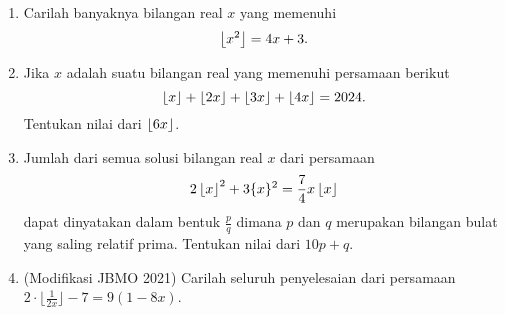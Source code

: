 \documentclass[11pt]{scrartcl}
\begin{document}
\begin{enumerate}
    \item Carilah banyaknya bilangan real $x$ yang memenuhi
    $$\left\lfloor x^2 \right\rfloor=4x+3.$$

    \item Jika $x$ adalah suatu bilangan real yang memenuhi persamaan berikut
    $$\left\lfloor x \right\rfloor+\left\lfloor 2x \right\rfloor+\left\lfloor 3x \right\rfloor+\left\lfloor 4x \right\rfloor=2024.$$
    Tentukan nilai dari $\left\lfloor 6x \right\rfloor$.

    \item Jumlah dari semua solusi bilangan real $x$ dari persamaan
    $$2\left\lfloor x \right\rfloor^2+3\{x\}^2=\frac{7}{4}x\left\lfloor x \right\rfloor$$
    dapat dinyatakan dalam bentuk $\frac{p}{q}$ dimana $p$ dan $q$ merupakan bilangan bulat yang saling relatif prima. Tentukan nilai dari $10p+q$.

    
    \item (Modifikasi JBMO 2021) Carilah seluruh penyelesaian dari persamaan $2\cdot \lfloor{\frac{1}{2x}}\rfloor - 7 = 9(1 - 8x)$.
\end{enumerate}
\end{document}
